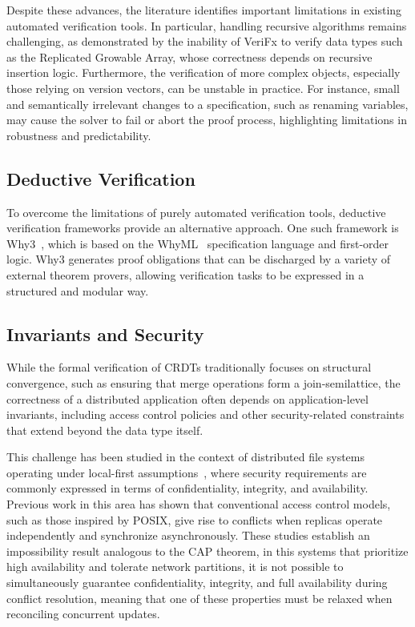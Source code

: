 Despite these advances, the literature identifies important limitations in existing automated verification tools. In particular, handling recursive algorithms remains challenging, as demonstrated by the inability of VeriFx to verify data types such as the Replicated Growable Array, whose correctness depends on recursive insertion logic. Furthermore, the verification of more complex objects, especially those relying on version vectors, can be unstable in practice. For instance, small and semantically irrelevant changes to a specification, such as renaming variables, may cause the solver to fail or abort the proof process, highlighting limitations in robustness and predictability.

\subsection{Deductive Verification}
\label{sub:deductive}

To overcome the limitations of purely automated verification tools, deductive verification frameworks provide an alternative approach. One such framework is Why3~\cite{why3}, which is based on the WhyML~\cite{whyml} specification language and first-order logic. Why3 generates proof obligations that can be discharged by a variety of external theorem provers, allowing verification tasks to be expressed in a structured and modular way.

\subsection{Invariants and Security}
\label{sub:invariants_security}

While the formal verification of CRDTs traditionally focuses on structural convergence, such as ensuring that merge operations form a join-semilattice, the correctness of a distributed application often depends on application-level invariants, including access control policies and other security-related constraints that extend beyond the data type itself.

This challenge has been studied in the context of distributed file systems operating under local-first assumptions~\cite{yanakieva2021access}, where security requirements are commonly expressed in terms of confidentiality, integrity, and availability. Previous work in this area has shown that conventional access control models, such as those inspired by POSIX, give rise to conflicts when replicas operate independently and synchronize asynchronously. These studies establish an impossibility result analogous to the CAP theorem, in this systems that prioritize high availability and tolerate network partitions, it is not possible to simultaneously guarantee confidentiality, integrity, and full availability during conflict resolution, meaning that one of these properties must be relaxed when reconciling concurrent updates.

